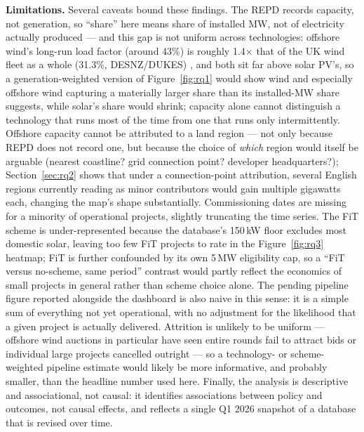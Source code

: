 \documentclass[11pt]{article}
\begin{document}
\textbf{Limitations.} Several caveats bound these findings. The REPD records capacity, not generation, so ``share'' here means share of installed MW, not of electricity actually produced --- and this gap is not uniform across technologies: offshore wind's long-run load factor (around 43\%) is roughly 1.4$\times$ that of the UK wind fleet as a whole (31.3\%, DESNZ/DUKES) \citep{renewableuk_ukwed}, and both sit far above solar PV's, so a generation-weighted version of Figure~\ref{fig:rq1} would show wind and especially offshore wind capturing a materially larger share than its installed-MW share suggests, while solar's share would shrink; capacity alone cannot distinguish a technology that runs most of the time from one that runs only intermittently. Offshore capacity cannot be attributed to a land region --- not only because REPD does not record one, but because the choice of \emph{which} region would itself be arguable (nearest coastline? grid connection point? developer headquarters?); Section~\ref{sec:rq2} shows that under a connection-point attribution, several English regions currently reading as minor contributors would gain multiple gigawatts each, changing the map's shape substantially. Commissioning dates are missing for a minority of operational projects, slightly truncating the time series. The FiT scheme is under-represented because the database's 150\,kW floor excludes most domestic solar, leaving too few FiT projects to rate in the Figure~\ref{fig:rq3} heatmap; FiT is further confounded by its own 5\,MW eligibility cap, so a ``FiT versus no-scheme, same period'' contrast would partly reflect the economics of small projects in general rather than scheme choice alone. The pending pipeline figure reported alongside the dashboard is also naive in this sense: it is a simple sum of everything not yet operational, with no adjustment for the likelihood that a given project is actually delivered. Attrition is unlikely to be uniform --- offshore wind auctions in particular have seen entire rounds fail to attract bids or individual large projects cancelled outright \citep{carbonbrief_ar7} --- so a technology- or scheme-weighted pipeline estimate would likely be more informative, and probably smaller, than the headline number used here. Finally, the analysis is descriptive and associational, not causal: it identifies associations between policy and outcomes, not causal effects, and reflects a single Q1 2026 snapshot of a database that is revised over time.

\end{document}

